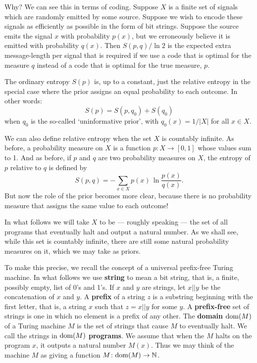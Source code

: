 \documentclass{article}
\newcommand{\N}{{\mathbb N}}
\newcommand{\dom}{{\rm dom}}
\renewcommand{\to}{\rightarrow}
\newcommand{\maps}{\colon}
\begin{document}
Why?  We can see this in terms of coding.  Suppose $X$ is a
finite set of signals which are randomly emitted by some source.
Suppose we wish to encode these signals as efficiently as possible in
the form of bit strings.  Suppose the source emits the signal $x$ with
probability $p(x)$, but we erroneously believe it is emitted with
probability $q(x)$.  Then $S(p,q)/\ln 2$ is the expected extra
message-length per signal that is required if we use a code that is
optimal for the measure $q$ instead of a code that is optimal for the
true measure, $p$.

The ordinary entropy $S(p)$ is, up to a constant, just the
relative entropy in the special case where the prior assigns 
an equal probability to each outcome.  In other words:
\[  S(p) = S(p,q_0) + S(q_0)  \]
when $q_0$ is the so-called `uninformative prior', with $q_0(x) =
1/|X|$ for all $x \in X$.  

We can also define relative entropy when the set $X$ is countably
infinite.  As before, a probability measure on $X$ is a function $p
\maps X \to [0,1]$ whose values sum to 1.  And as before, if $p$ and
$q$ are two probability measures on $X$, the entropy of $p$ relative
to $q$ is defined by
\begin{equation}
\label{relative_entropy}
  S(p,q) = -\sum_{x \in X} p(x) \, \ln\frac{p(x)}{q(x)} .
\end{equation} 
But now the role of the prior becomes more clear, because there
is no probability measure that assigns the same value to each outcome!

In what follows we will take $X$ to be --- roughly speaking --- the
set of all programs that eventually halt and output a natural 
number.  As we shall see, while this set is countably infinite, there 
are still some natural probability measures on it, which we may take
as priors.

To make this precise, we recall the concept of a universal
prefix-free Turing machine.  In what follows we use {\bf string} to
mean a bit string, that is, a finite, possibly empty, list of 0's and
1's.  If $x$ and $y$ are strings, let $x||y$ be the concatenation of
$x$ and $y.$ A \textbf{prefix} of a string $z$ is a substring
beginning with the first letter, that is, a string $x$ such that $z =
x||y$ for some $y$.  A \textbf{prefix-free} set of strings is one in
which no element is a prefix of any other.  The \textbf{domain}
$\dom(M)$ of a Turing machine $M$ is the set of strings that cause $M$
to eventually halt.  We call the strings in $\dom(M)$
\textbf{programs}.  We assume that when the $M$ halts on the program
$x$, it outputs a natural number $M(x)$.  Thus we may think of the
machine $M$ as giving a function $M \maps \dom(M) \to \N$.
\end{document}
